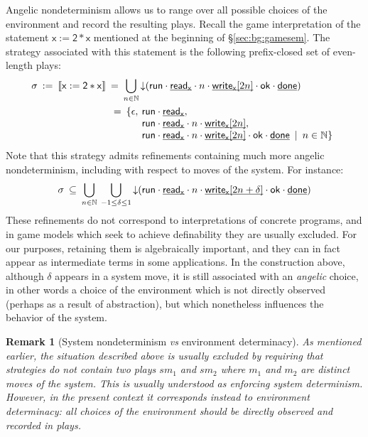 \documentclass[11pt,oneside]{book}
\newtheorem{remark}[theorem]{Remark}
\theoremstyle{definition}
\newcommand{\kw}[1]{\ensuremath{ \mathsf{#1} }}
\newcommand{\ul}[1]{%
  \underline{\smash{#1}}
}
\begin{document}
Angelic nondeterminism
allows us to range over all possible choices of the environment
and record the resulting plays.
Recall the game interpretation of the statement
$\kw{x := 2 * x}$
mentioned at the beginning of \S\ref{sec:bg:gamesem}.
The strategy associated with this statement
is the following prefix-closed set of even-length plays:
\begin{align*}
  \sigma \: := \: \llbracket \kw{x := 2 * x} \rrbracket \: &= \:
    \bigcup_{n \in \mathbb{N}} {\downarrow}(
      \kw{run} \cdot
      \ul{\kw{read}_\kw{x}} \cdot n \cdot
      \ul{\kw{write}_\kw{x}[2n]} \cdot \kw{ok} \cdot
      \ul{\kw{done}})
  \\
  &\begin{array}{@{}r@{}l}
     \phantom:= \: \{ \epsilon, \: {}
     &\kw{run} \cdot
        \ul{\kw{read}_\kw{x}} , \\
     &\kw{run} \cdot
        \ul{\kw{read}_\kw{x}} \cdot n \cdot
        \ul{\kw{write}_\kw{x}[2n]} , \\
     &\kw{run} \cdot
        \ul{\kw{read}_\kw{x}} \cdot n \cdot
        \ul{\kw{write}_\kw{x}[2n]} \cdot \kw{ok} \cdot
        \ul{\kw{done}}
        \: \mid \: n \in \mathbb{N} \}
   \end{array}
\end{align*}
Note that this strategy admits refinements
containing much more angelic nondeterminism,
including with respect to moves of the system.
For instance:
\[
  \sigma \: \subseteq \:
    \bigcup_{n \in \mathbb{N}} \:
    \bigcup_{-1 \le \delta \le 1}
    {\downarrow}(
      \kw{run} \cdot
      \ul{\kw{read}_\kw{x}} \cdot n \cdot
      \ul{\kw{write}_\kw{x}[2n + \delta]} \cdot \kw{ok} \cdot
      \ul{\kw{done}})
\]
These refinements do not correspond to interpretations
of concrete programs,
and in game models which seek to achieve definability
they are usually excluded.
For our purposes,
retaining them is algebraically important,
and they can in fact appear as intermediate terms
in some applications.
In the construction above,
although $\delta$ appears in a system move,
it is still associated with an \emph{angelic} choice,
in other words a choice of the environment
which is not directly observed
(perhaps as a result of abstraction),
but which nonetheless influences the behavior of the system.

\begin{remark}[System nondeterminism \emph{vs} environment determinacy] %
As mentioned earlier,
the situation described above is usually excluded
by requiring that strategies
do not contain two plays $s m_1$ and $s m_2$
where $m_1$ and $m_2$ are distinct moves of the system.
This is usually understood as enforcing \emph{system determinism}.
However,
in the present context
it corresponds instead to \emph{environment determinacy}:
all choices of the environment
should be directly observed and recorded in plays.
\end{remark}
\end{document}
